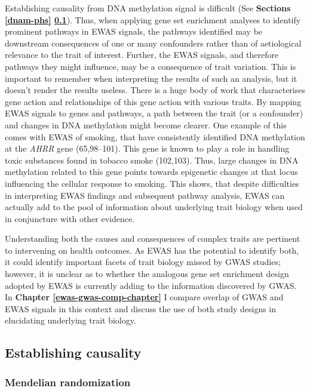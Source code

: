 \documentclass[11pt,oneside]{bristolthesis}
\begin{document}
Establishing causality from DNA methylation signal is difficult (See \textbf{Sections \ref{dnam-phs} \ref{establishing-causality}}). Thus, when applying gene set enrichment analyses to identify prominent pathways in EWAS signals, the pathways identified may be downstream consequences of one or many confounders rather than of aetiological relevance to the trait of interest. Further, the EWAS signals, and therefore pathways they might influence, may be a consequence of trait variation. This is important to remember when interpreting the results of such an analysis, but it doesn't render the results useless. There is a huge body of work that characterises gene action and relationships of this gene action with various traits. By mapping EWAS signals to genes and pathways, a path between the trait (or a confounder) and changes in DNA methylation might become clearer. One example of this comes with EWAS of smoking, that have consistently identified DNA methylation at the \emph{AHRR} gene (65,98--101). This gene is known to play a role in handling toxic substances found in tobacco smoke (102,103). Thus, large changes in DNA methylation related to this gene points towards epigenetic changes at that locus influencing the cellular response to smoking. This shows, that despite difficulties in interpreting EWAS findings and subsequent pathway analysis, EWAS can actually add to the pool of information about underlying trait biology when used in conjuncture with other evidence.

Understanding both the causes and consequences of complex traits are pertinent to intervening on health outcomes. As EWAS has the potential to identify both, it could identify important facets of trait biology missed by GWAS studies; however, it is unclear as to whether the analogous gene set enrichment design adopted by EWAS is currently adding to the information discovered by GWAS. In \textbf{Chapter \ref{ewas-gwas-comp-chapter}} I compare overlap of GWAS and EWAS signals in this context and discuss the use of both study designs in elucidating underlying trait biology.

\hypertarget{establishing-causality}{%
\subsection{Establishing causality}\label{establishing-causality}}

\hypertarget{mendelian-randomization}{%
\subsubsection{Mendelian randomization}\label{mendelian-randomization}}
\end{document}
